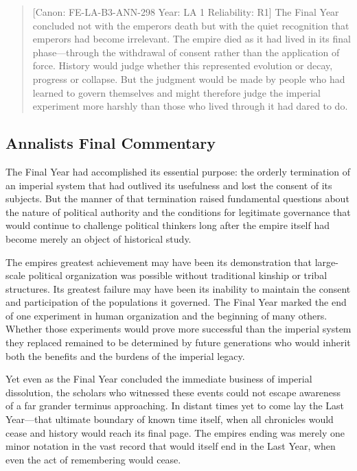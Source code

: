 \begin{quote}
{[}Canon: FE-LA-B3-ANN-298 \textbar{} Year: LA 1 \textbar{} Reliability:
R1{]} The Final Year concluded not with the emperor\textquotesingle s
death but with the quiet recognition that emperors had become
irrelevant. The empire died as it had lived in its final phase---through
the withdrawal of consent rather than the application of force. History
would judge whether this represented evolution or decay, progress or
collapse. But the judgment would be made by people who had learned to
govern themselves and might therefore judge the imperial experiment more
harshly than those who lived through it had dared to do.
\end{quote}

\subsection{Annalist\textquotesingle s Final
Commentary}\label{annalists-final-commentary}

The Final Year had accomplished its essential purpose: the orderly
termination of an imperial system that had outlived its usefulness and
lost the consent of its subjects. But the manner of that termination
raised fundamental questions about the nature of political authority and
the conditions for legitimate governance that would continue to
challenge political thinkers long after the empire itself had become
merely an object of historical study.

The empire\textquotesingle s greatest achievement may have been its
demonstration that large-scale political organization was possible
without traditional kinship or tribal structures. Its greatest failure
may have been its inability to maintain the consent and participation of
the populations it governed. The Final Year marked the end of one
experiment in human organization and the beginning of many others.
Whether those experiments would prove more successful than the imperial
system they replaced remained to be determined by future generations who
would inherit both the benefits and the burdens of the imperial legacy.

Yet even as the Final Year concluded the immediate business of imperial
dissolution, the scholars who witnessed these events could not escape
awareness of a far grander terminus approaching. In distant times yet to
come lay the Last Year---that ultimate boundary of known time itself,
when all chronicles would cease and history would reach its final page.
The empire\textquotesingle s ending was merely one minor notation in the
vast record that would itself end in the Last Year, when even the act of
remembering would cease.


